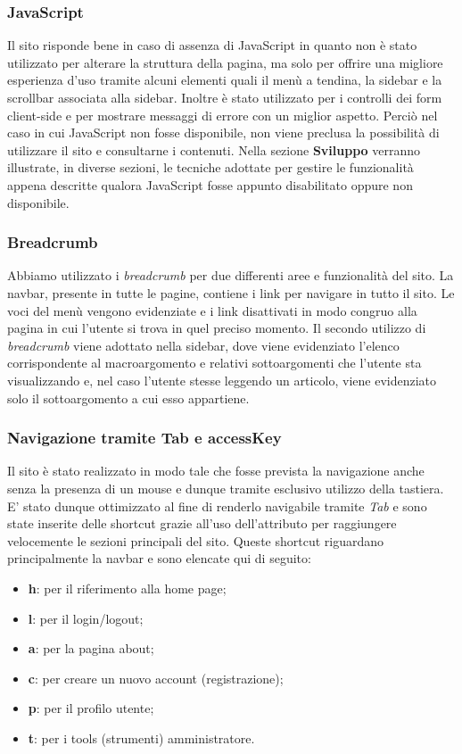 \documentclass[12pt]{article}
\begin{document}
	\subsubsection{JavaScript}
	Il sito risponde bene in caso di assenza di JavaScript in quanto non è stato utilizzato per alterare la struttura della pagina, ma solo per offrire una migliore esperienza d'uso tramite alcuni elementi quali il menù a tendina, la sidebar e la scrollbar associata alla sidebar. Inoltre è stato utilizzato per i controlli dei form client-side e per mostrare messaggi di errore con un miglior aspetto.  Perciò nel caso in cui JavaScript non fosse disponibile, non viene preclusa la possibilità di utilizzare il sito e consultarne i contenuti.
	Nella sezione \textbf{Sviluppo} verranno illustrate, in diverse sezioni, le tecniche adottate per gestire le funzionalità appena descritte qualora JavaScript fosse appunto disabilitato oppure non disponibile.
	\subsubsection{Breadcrumb}
	Abbiamo utilizzato i \emph{breadcrumb} per due differenti aree e funzionalità del sito. La navbar, presente in tutte le pagine, contiene i link per navigare in tutto il sito. Le voci del menù vengono evidenziate e i link disattivati in modo congruo alla pagina in cui l'utente si trova in quel preciso momento. Il secondo utilizzo di \emph{breadcrumb} viene adottato nella sidebar, dove viene evidenziato l'elenco corrispondente al macroargomento e relativi sottoargomenti che l'utente sta visualizzando e, nel caso l'utente stesse leggendo un articolo, viene evidenziato solo il sottoargomento a cui esso appartiene.
	\subsubsection{Navigazione tramite Tab e accessKey}
	Il sito è stato realizzato in modo tale che fosse prevista la navigazione anche senza la presenza di un mouse e dunque tramite esclusivo utilizzo della tastiera. E' stato dunque ottimizzato al fine di renderlo navigabile tramite \emph{Tab} e sono state inserite delle shortcut grazie all'uso dell'attributo  per raggiungere velocemente le sezioni principali del sito. Queste shortcut riguardano principalmente la navbar e sono elencate qui di seguito:
	\begin{itemize}
	\item \textbf{h}: per il riferimento alla home page;
	\item \textbf{l}: per il login/logout;
	\item \textbf{a}: per la pagina about;
	\item \textbf{c}: per creare un nuovo account (registrazione);
	\item \textbf{p}: per il profilo utente;
	\item \textbf{t}: per i tools (strumenti) amministratore.
	\end{itemize}
	\newpage
\end{document}
